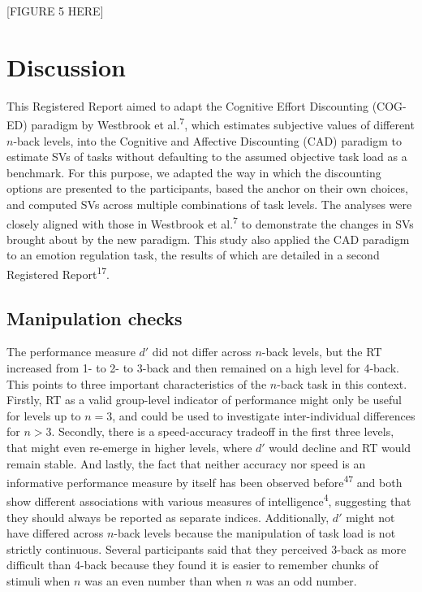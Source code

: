 \documentclass[
  man,floatsintext]{apa6}
\begin{document}
{[}FIGURE 5 HERE{]}

\hypertarget{discussion}{%
\section{Discussion}\label{discussion}}

This Registered Report aimed to adapt the Cognitive Effort Discounting (COG-ED) paradigm by Westbrook et al.\textsuperscript{7}, which estimates subjective values of different \(n\)-back levels, into the Cognitive and Affective Discounting (CAD) paradigm to estimate SVs of tasks without defaulting to the assumed objective task load as a benchmark.
For this purpose, we adapted the way in which the discounting options are presented to the participants, based the anchor on their own choices, and computed SVs across multiple combinations of task levels.
The analyses were closely aligned with those in Westbrook et al.\textsuperscript{7} to demonstrate the changes in SVs brought about by the new paradigm.
This study also applied the CAD paradigm to an emotion regulation task, the results of which are detailed in a second Registered Report\textsuperscript{17}.

\hypertarget{manipulation-checks-1}{%
\subsection{Manipulation checks}\label{manipulation-checks-1}}

The performance measure \(d'\) did not differ across \(n\)-back levels, but the RT increased from 1- to 2- to 3-back and then remained on a high level for 4-back.
This points to three important characteristics of the \(n\)-back task in this context.
Firstly, RT as a valid group-level indicator of performance might only be useful for levels up to \(n=3\), and could be used to investigate inter-individual differences for \(n>3\).
Secondly, there is a speed-accuracy tradeoff in the first three levels, that might even re-emerge in higher levels, where \(d'\) would decline and RT would remain stable.
And lastly, the fact that neither accuracy nor speed is an informative performance measure by itself has been observed before\textsuperscript{47} and both show different associations with various measures of intelligence\textsuperscript{4}, suggesting that they should always be reported as separate indices.
Additionally, \(d'\) might not have differed across \(n\)-back levels because the manipulation of task load is not strictly continuous.
Several participants said that they perceived 3-back as more difficult than 4-back because they found it is easier to remember chunks of stimuli when \(n\) was an even number than when \(n\) was an odd number.
\end{document}
